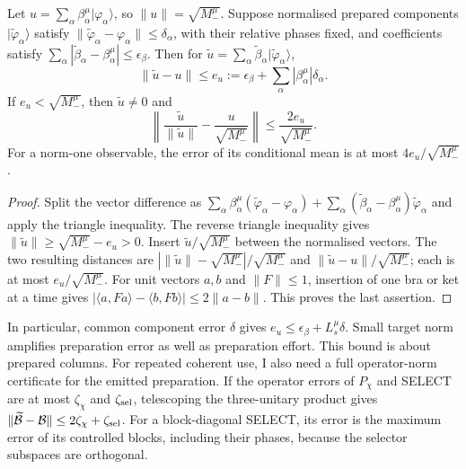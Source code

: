 \begin{proposition}
\label{prop:sg-component-error}
Let $u=\sum_\alpha\beta_\alpha^\mu|\varphi_\alpha\rangle$, so
$\|u\|=\sqrt{M_-^\mu}$. Suppose normalised prepared components
$|\widetilde\varphi_\alpha\rangle$ satisfy
$\|\widetilde\varphi_\alpha-\varphi_\alpha\|\leq\delta_\alpha$,
with their relative phases fixed, and coefficients satisfy
$\sum_\alpha|\widetilde\beta_\alpha-\beta_\alpha^\mu|\leq\epsilon_\beta$.
Then for $\widetilde u=\sum_\alpha
\widetilde\beta_\alpha|\widetilde\varphi_\alpha\rangle$,
\[
 \|\widetilde u-u\|\leq
 e_u:=\epsilon_\beta+\sum_\alpha|\beta_\alpha^\mu|\delta_\alpha.
\]
If $e_u<\sqrt{M_-^\mu}$, then $\widetilde u\ne0$ and
\begin{equation}
 \left\|\frac{\widetilde u}{\|\widetilde u\|}
               -\frac{u}{\sqrt{M_-^\mu}}\right\|
       \leq \frac{2e_u}{\sqrt{M_-^\mu}}.
 \label{eq:sg-normalised-precision}
\end{equation}
For a norm-one observable, the error of its conditional mean is at most
$4e_u/\sqrt{M_-^\mu}$.
\end{proposition}
\begin{proof}
Split the vector difference as
$\sum_\alpha\beta_\alpha^\mu
(\widetilde\varphi_\alpha-\varphi_\alpha)
+\sum_\alpha(\widetilde\beta_\alpha-\beta_\alpha^\mu)
\widetilde\varphi_\alpha$ and apply the triangle inequality.
The reverse triangle inequality gives
$\|\widetilde u\|\geq\sqrt{M_-^\mu}-e_u>0$.
Insert $\widetilde u/\sqrt{M_-^\mu}$ between the normalised vectors.
The two resulting distances are
$|\|\widetilde u\|-\sqrt{M_-^\mu}|/\sqrt{M_-^\mu}$
and $\|\widetilde u-u\|/\sqrt{M_-^\mu}$; each is at most
$e_u/\sqrt{M_-^\mu}$.
For unit vectors $a,b$ and $\|F\|\leq1$, insertion of one bra or ket
at a time gives
$|\langle a,Fa\rangle-\langle b,Fb\rangle|\leq2\|a-b\|$.
This proves the last assertion.
\end{proof}

In particular, common component error $\delta$ gives
$e_u\leq\epsilon_\beta+L_s^\mu\delta$. Small target norm amplifies
preparation error as well as preparation effort.
This bound is about prepared columns. For repeated coherent use,
I also need a full operator-norm certificate for the emitted preparation.
If the operator errors of $P_\chi$ and SELECT are at most
$\zeta_\chi$ and $\zeta_{\rm sel}$, telescoping the three-unitary
product gives
$\|\widetilde{\mathcal B}-\mathcal B\|
\leq2\zeta_\chi+\zeta_{\rm sel}$.
For a block-diagonal SELECT, its error is the maximum error of its
controlled blocks, including their phases, because the selector
subspaces are orthogonal.

